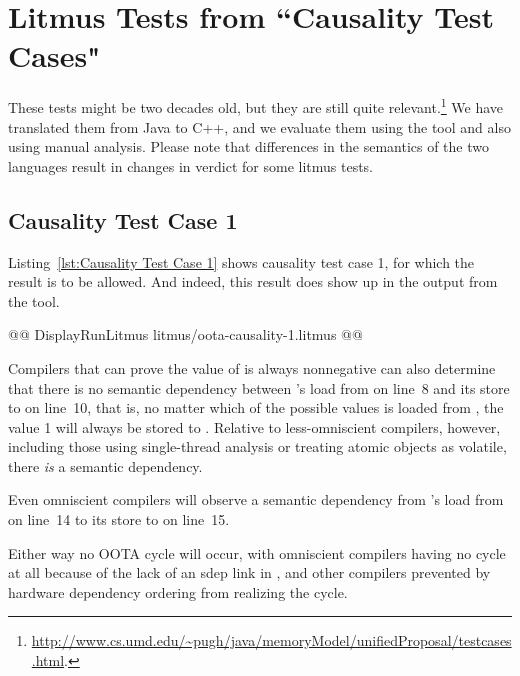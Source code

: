 \documentclass[10]{article}
\begin{document}

\clearpage

\section{Litmus Tests from “Causality Test Cases"}
\label{app:Litmus Tests from “Causality Test Cases"}

These tests might be two decades old, but they are still quite
relevant.\footnote{
	\url{http://www.cs.umd.edu/~pugh/java/memoryModel/unifiedProposal/testcases.html}.}
We have translated them from Java to C++, and we evaluate them using
the  tool and also using manual analysis.
Please note that differences in the semantics of the two languages
result in changes in verdict for some litmus tests.

\subsection{Causality Test Case 1}
\label{app:Causality Test Case 1}

Listing~\ref{lst:Causality Test Case 1}
shows causality test case 1, for which the  result
is to be allowed.
And indeed, this result does show up in the output from the  tool.

\begin{listing}[tbp]
@@ DisplayRunLitmus litmus/oota-causality-1.litmus @@
\caption{Causality Test Case 1}
\label{lst:Causality Test Case 1}
\end{listing}

Compilers that can prove the value of  is always
nonnegative can also determine that there is no semantic dependency between
's load from  on line~8 and its store to  on line~10,
that is, no matter which of the possible values is loaded from ,
the value 1 will always be stored to .
Relative to less-omniscient compilers, however,
including those using single-thread analysis or treating atomic
objects as volatile, there \emph{is} a semantic dependency.

Even omniscient compilers will observe a semantic dependency from
's load from  on line~14 to its store to  on line~15.

Either way no OOTA cycle will occur, with omniscient compilers
having no cycle at all because of the lack of an sdep link in ,
and other compilers prevented by hardware
dependency ordering from realizing the cycle.
\end{document}
